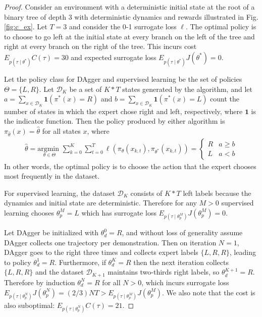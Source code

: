 \documentclass[10pt, conference]{ieeeconf}      %
\newcommand{\mD}{\mathcal{D}}
\begin{document}
\begin{proof}
Consider an environment with a deterministic initial state at the root of a binary tree of depth 3 with deterministic dynamics and rewards illustrated in Fig. \ref{fig:c_ex}.
Let $T = 3$ and consider the 0-1 surrogate loss $\ell$.
The optimal policy is to choose to go left at the initial state at every branch on the left of the tree and right at every branch on the right of the tree.
This incurs cost $E_{p(\tau \mid \theta^*)} C(\tau) = 30$ and expected surrogate loss $E_{p(\tau \mid \theta^*)} J(\theta^*) = 0$.

Let the policy class for DAgger and supervised learning be the set of policies $\Theta = \{L, R\}$.
Let $\mD_K$ be a set of $K * T$ states generated by the algorithm, and let $a = \sum_{x \in \mD_K} \mathbf{1}(\pi^*(x) = R)$ and $b = \sum_{x \in \mD_K} \mathbf{1}(\pi^*(x) = L)$ count the number of states in which the expert chose right and left, respectively, where $\mathbf{1}$ is the indicator function. 
Then the policy produced by either algorithm is $\pi_{\hat{\theta}}(x) = \hat{\theta}$ for all states $x$, where
\vspace{-2ex}
\begin{align*}
	\hat{\theta} = \underset{\theta \in \Theta}{\text{argmin }} \sum_{k=0}^K \sum_{t=0}^T \ell(\pi_{\theta}(x_{k,t}), \pi_{\theta^*}(x_{k,t})) = \left\{ \begin{array}{cc} R & a \geq b \\ L & a < b \end{array} \right.
\end{align*}
\noindent In other words, the optimal policy is to choose the action that the expert chooses most frequently in the dataset.

For supervised learning, the dataset $\mD_K$ consists of $K * T$ left labels because the dynamics and initial state are deterministic.
Therefore for any $M > 0$ supervised learning chooses $\theta_{p}^M = L$ which has surrogate loss $E_{p(\tau \mid \theta_{p}^M)} J(\theta_{p}^M) = 0$.

Let DAgger be initialized with $\theta_d^0 = R$, and without loss of generality assume DAgger collects one trajectory per demonstration.
Then on iteration $N=1$, DAgger goes to the right three times and collects expert labels $\{L, R, R\}$, leading to policy $\theta_{d}^1 = R$.
Furthermore, if $\theta_{d}^K = R$ then the next iteration collects $\{L, R, R\}$ and the dataset $\mD_{K+1}$ maintains two-thirds right labels, so $\theta_{d}^{K+1} = R$.
Therefore by induction $\theta_{d}^{N} = R$ for all $N > 0$, which incurs surrogate loss $E_{p(\tau \mid \theta_{p}^N)} J(\theta_{p}^N) = (2 / 3) N T > E_{p(\tau \mid \theta_{p}^M)} J(\theta_{p}^M)$.
We also note that the cost is also suboptimal: $E_{p(\tau \mid \theta_{p}^N)} C(\tau) = 21$.
\end{proof}
\end{document}
